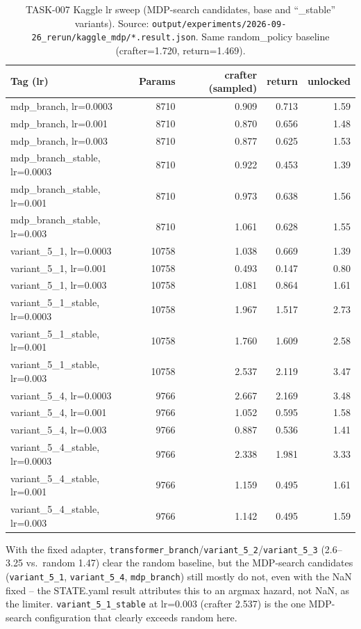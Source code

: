\documentclass[11pt]{article}
\newcommand{\srcpath}[1]{\texttt{\small #1}}
\begin{document}
\begin{table}[h]
\centering
\small
\caption{TASK-007 Kaggle lr sweep (MDP-search candidates, base and ``\_stable'' variants). Source: \srcpath{output/experiments/2026-09-26\_rerun/kaggle\_mdp/*.result.json}. Same random\_policy baseline (crafter=1.720, return=1.469).}
\begin{tabular}{lrrrr}
\toprule
Tag (lr) & Params & crafter (sampled) & return & unlocked \\
\midrule
mdp\_branch, lr=0.0003 & 8710 & 0.909 & 0.713 & 1.59 \\
mdp\_branch, lr=0.001 & 8710 & 0.870 & 0.656 & 1.48 \\
mdp\_branch, lr=0.003 & 8710 & 0.877 & 0.625 & 1.53 \\
mdp\_branch\_stable, lr=0.0003 & 8710 & 0.922 & 0.453 & 1.39 \\
mdp\_branch\_stable, lr=0.001 & 8710 & 0.973 & 0.638 & 1.56 \\
mdp\_branch\_stable, lr=0.003 & 8710 & 1.061 & 0.628 & 1.55 \\
variant\_5\_1, lr=0.0003 & 10758 & 1.038 & 0.669 & 1.39 \\
variant\_5\_1, lr=0.001 & 10758 & 0.493 & 0.147 & 0.80 \\
variant\_5\_1, lr=0.003 & 10758 & 1.081 & 0.864 & 1.61 \\
variant\_5\_1\_stable, lr=0.0003 & 10758 & 1.967 & 1.517 & 2.73 \\
variant\_5\_1\_stable, lr=0.001 & 10758 & 1.760 & 1.609 & 2.58 \\
variant\_5\_1\_stable, lr=0.003 & 10758 & 2.537 & 2.119 & 3.47 \\
variant\_5\_4, lr=0.0003 & 9766 & 2.667 & 2.169 & 3.48 \\
variant\_5\_4, lr=0.001 & 9766 & 1.052 & 0.595 & 1.58 \\
variant\_5\_4, lr=0.003 & 9766 & 0.887 & 0.536 & 1.41 \\
variant\_5\_4\_stable, lr=0.0003 & 9766 & 2.338 & 1.981 & 3.33 \\
variant\_5\_4\_stable, lr=0.001 & 9766 & 1.159 & 0.495 & 1.61 \\
variant\_5\_4\_stable, lr=0.003 & 9766 & 1.142 & 0.495 & 1.59 \\
\bottomrule
\end{tabular}
\end{table}

With the fixed adapter, \texttt{transformer\_branch}/\texttt{variant\_5\_2}/\texttt{variant\_5\_3}
(2.6--3.25 vs.\ random 1.47) clear the random baseline, but the MDP-search candidates
(\texttt{variant\_5\_1}, \texttt{variant\_5\_4}, \texttt{mdp\_branch}) still mostly do not, even with
the NaN fixed -- the STATE.yaml result attributes this to an argmax hazard, not NaN, as the limiter.
\texttt{variant\_5\_1\_stable} at lr=0.003 (crafter 2.537) is the one MDP-search configuration that
clearly exceeds random here.
\end{document}
